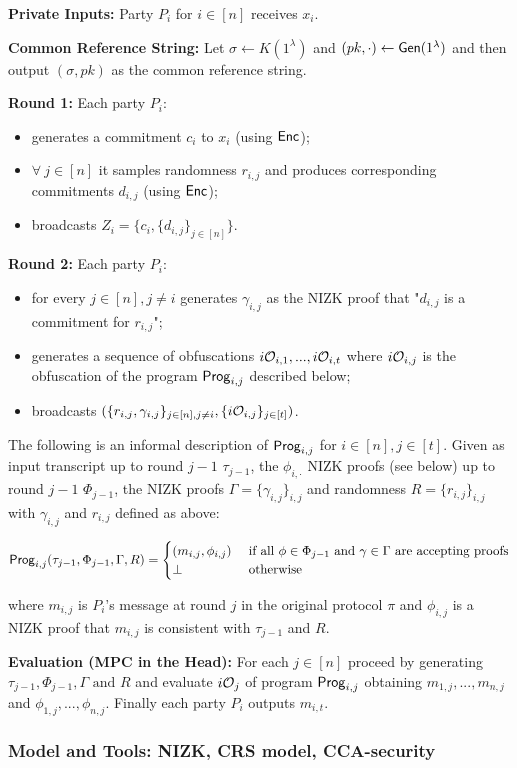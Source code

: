 \noindent
\textbf{Private Inputs:} Party $P_i$ for $i \in [n]$ receives $x_i$.

\noindent
\textbf{Common Reference String:} Let $\sigma \gets K(1^{\lambda})$ and $(pk, \cdot) \gets \mathsf{Gen}(1^{\lambda})$ and then output $(\sigma, pk)$ as the common reference string.

\noindent
\textbf{Round 1:} Each party $P_i$:
\begin{itemize}
	\item generates a commitment $c_i$ to $x_i$ (using $\mathsf{Enc}$);
	\item $\forall\ j \in [n]$ it samples randomness $r_{i,j}$ and produces corresponding commitments $d_{i,j}$ (using $\mathsf{Enc}$);
	\item broadcasts $Z_i = \{c_i, \{ d_{i,j} \}_{j \in [n]}  \}$.
\end{itemize}

\noindent
\textbf{Round 2:} Each party $P_i$:
\begin{itemize}
	\item for every $j \in [n], j \not = i$ generates $\gamma_{i,j}$ as the NIZK proof that "$d_{i,j}$ is a commitment for $r_{i,j}$";
	\item generates a sequence of obfuscations $i\mathcal{O}_{i,1},...,i\mathcal{O}_{i,t}$ where $i\mathcal{O}_{i,j}$ is the obfuscation of the program $\mathsf{Prog}_{i,j}$ described below;
	\item broadcasts $( \{ r_{i,j}, \gamma_{i,j} \}_{j \in [n], j \not = i}, \{ i\mathcal{O}_{i,j} \}_{j \in [t]})$.
\end{itemize}

The following is an informal description of $\mathsf{Prog}_{i,j}$ for $i \in [n], j \in [t]$.
Given as input transcript up to round $j-1$ $\tau_{j-1}$, the $\phi_{i,\cdot}$ NIZK proofs (see below) up to round $j-1$ $\Phi_{j-1}$, the NIZK proofs $\Gamma = \{ \gamma_{i,j} \}_{i,j}$ and randomness $R = \{ r_{i,j} \}_{i,j}$ with $\gamma_{i,j}$ and $r_{i,j}$ defined as above:

\[
\Prog_{i,j}(\tau_{j-1}, \Phi_{j-1}, \Gamma, R) =
\begin{cases} 
\hfill (m_{i,j}, \phi_{i,j})    \hfill & \text{ if all $\phi \in \Phi_{j-1}$ and $\gamma \in \Gamma$ are accepting proofs} \\
\bot \hfill & \text{ otherwise } \\
\end{cases}
\]

where $m_{i,j}$ is $P_i$'s message at round $j$ in the original protocol $\pi$ and $\phi_{i,j}$ is a NIZK proof that $m_{i,j}$ is consistent with $\tau_{j-1}$ and $R$.

\noindent
\textbf{Evaluation (MPC in the Head):} For each $j \in [n]$ proceed by generating $\tau_{j-1}, \Phi_{j-1}, \Gamma \mbox{ and } R$ and evaluate $i\mathcal{O}_j$ of program $\mathsf{Prog}_{i,j}$ obtaining $m_{1,j},...,m_{n,j}$
and $\phi_{1,j},...,\phi_{n,j}$. Finally each party $P_i$ outputs $m_{i,t}$.




\subsubsection{Model and Tools: NIZK, CRS model, CCA-security}


